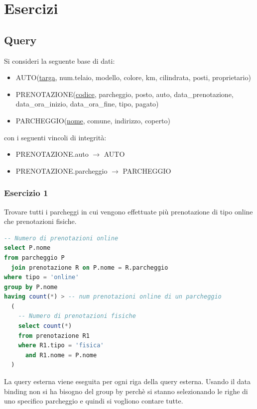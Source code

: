 \documentclass[a4paper]{article}
\begin{document}
\section{Esercizi}
\subsection{Query}
Si consideri la seguente base di dati:
\begin{itemize}
  \item AUTO(\underline{targa}, num.telaio, modello, colore, km, cilindrata, posti,
    proprietario)

  \item PRENOTAZIONE(\underline{codice}, parcheggio, posto, auto, data\_prenotazione,
    data\_ora\_inizio, data\_ora\_fine, tipo, pagato)

  \item PARCHEGGIO(\underline{nome}, comune, indirizzo, coperto)
\end{itemize}
con i seguenti vincoli di integrità:
\begin{itemize}
  \item PRENOTAZIONE.auto \( \to  \) AUTO
  \item PRENOTAZIONE.parcheggio \( \to  \) PARCHEGGIO
\end{itemize}

\subsubsection{Esercizio 1}
Trovare tutti i parcheggi in cui vengono effettuate più prenotazione di
tipo online che prenotazioni fisiche.
\begin{lstlisting}[language=SQL]
-- Numero di prenotazioni online
select P.nome
from parcheggio P
  join prenotazione R on P.nome = R.parcheggio
where tipo = 'online'
group by P.nome
having count(*) > -- num prenotazioni online di un parcheggio
  (
    -- Numero di prenotazioni fisiche
    select count(*)
    from prenotazione R1
    where R1.tipo = 'fisica'
      and R1.nome = P.nome
  )
\end{lstlisting}
La query esterna viene eseguita per ogni riga della query esterna. Usando il
data binding non si ha bisogno del group by perchè si stanno selezionando le
righe di uno specifico parcheggio e quindi si vogliono contare tutte.
\end{document}
